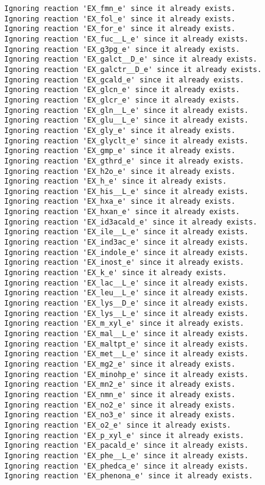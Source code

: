 \documentclass[
  letterpaper,
  DIV=11,
  numbers=noendperiod]{scrartcl}
\begin{document}
\begin{verbatim}
Ignoring reaction 'EX_fmn_e' since it already exists.
Ignoring reaction 'EX_fol_e' since it already exists.
Ignoring reaction 'EX_for_e' since it already exists.
Ignoring reaction 'EX_fuc__L_e' since it already exists.
Ignoring reaction 'EX_g3pg_e' since it already exists.
Ignoring reaction 'EX_galct__D_e' since it already exists.
Ignoring reaction 'EX_galctr__D_e' since it already exists.
Ignoring reaction 'EX_gcald_e' since it already exists.
Ignoring reaction 'EX_glcn_e' since it already exists.
Ignoring reaction 'EX_glcr_e' since it already exists.
Ignoring reaction 'EX_gln__L_e' since it already exists.
Ignoring reaction 'EX_glu__L_e' since it already exists.
Ignoring reaction 'EX_gly_e' since it already exists.
Ignoring reaction 'EX_glyclt_e' since it already exists.
Ignoring reaction 'EX_gmp_e' since it already exists.
Ignoring reaction 'EX_gthrd_e' since it already exists.
Ignoring reaction 'EX_h2o_e' since it already exists.
Ignoring reaction 'EX_h_e' since it already exists.
Ignoring reaction 'EX_his__L_e' since it already exists.
Ignoring reaction 'EX_hxa_e' since it already exists.
Ignoring reaction 'EX_hxan_e' since it already exists.
Ignoring reaction 'EX_id3acald_e' since it already exists.
Ignoring reaction 'EX_ile__L_e' since it already exists.
Ignoring reaction 'EX_ind3ac_e' since it already exists.
Ignoring reaction 'EX_indole_e' since it already exists.
Ignoring reaction 'EX_inost_e' since it already exists.
Ignoring reaction 'EX_k_e' since it already exists.
Ignoring reaction 'EX_lac__L_e' since it already exists.
Ignoring reaction 'EX_leu__L_e' since it already exists.
Ignoring reaction 'EX_lys__D_e' since it already exists.
Ignoring reaction 'EX_lys__L_e' since it already exists.
Ignoring reaction 'EX_m_xyl_e' since it already exists.
Ignoring reaction 'EX_mal__L_e' since it already exists.
Ignoring reaction 'EX_maltpt_e' since it already exists.
Ignoring reaction 'EX_met__L_e' since it already exists.
Ignoring reaction 'EX_mg2_e' since it already exists.
Ignoring reaction 'EX_minohp_e' since it already exists.
Ignoring reaction 'EX_mn2_e' since it already exists.
Ignoring reaction 'EX_nmn_e' since it already exists.
Ignoring reaction 'EX_no2_e' since it already exists.
Ignoring reaction 'EX_no3_e' since it already exists.
Ignoring reaction 'EX_o2_e' since it already exists.
Ignoring reaction 'EX_p_xyl_e' since it already exists.
Ignoring reaction 'EX_pacald_e' since it already exists.
Ignoring reaction 'EX_phe__L_e' since it already exists.
Ignoring reaction 'EX_phedca_e' since it already exists.
Ignoring reaction 'EX_phenona_e' since it already exists.

\end{verbatim}
\end{document}

